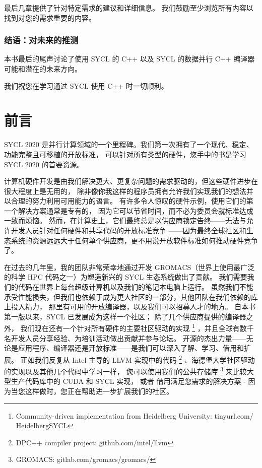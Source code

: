 最后几章提供了针对特定需求的建议和详细信息。 我们鼓励至少浏览所有内容以找到对您的需求重要的内容。

\subsubsection*{结语：对未来的推测}

本书最后的尾声讨论了使用 SYCL 的 C++ 以及 SYCL 的数据并行 C++ 编译器可能和潜在的未来方向。

我们祝您在学习通过 SYCL 使用 C++ 时一切顺利。

\newpage
\section*{前言}
SYCL 2020 是并行计算领域的一个里程碑。我们第一次拥有了一个现代、稳定、功能完整且可移植的开放标准，
可以针对所有类型的硬件，您手中的书是学习 SYCL 2020 的首要资源。

计算机硬件开发是由我们解决更大、更复杂问题的需求驱动的，但这些硬件进步在很大程度上是无用的，
除非像你我这样的程序员拥有允许我们实现我们的想法并以合理的努力利用可用能力的语言。
有许多令人惊叹的硬件示例，使用它们的第一个解决方案通常是专有的，
因为它可以节省时间，而不必为委员会就标准达成一致而烦恼。
然而，在计算史上，它们最终总是以供应商锁定告终——无法与允许开发人员针对任何硬件和共享代码的开放标准竞争
——因为最终全球社区和生态系统的资源远远大于任何单个供应商，更不用说开放软件标准如何推动硬件竞争了。

在过去的几年里，我的团队非常荣幸地通过开发 GROMACS（世界上使用最广泛的科学 HPC 代码之一）为塑造新兴的 SYCL 生态系统做出了贡献。 
我们需要我们的代码在世界上每台超级计算机以及我们的笔记本电脑上运行。 
虽然我们不能承受性能损失，但我们也依赖于成为更大社区的一部分，其他团队在我们依赖的库上投入精力，
那里有可用的开放编译器，以及我们可以招募人才的地方。 
自本书第一版以来，SYCL 已发展成为这样一个社区； 除了几个供应商提供的编译器之外，
我们现在还有一个针对所有硬件的主要社区驱动的实现
\footnote{Community-driven implementation from Heidelberg University: tinyurl.com/ HeidelbergSYCL}
，并且全球有数千名开发人员分享经验、为培训活动做出贡献并参与论坛。 
开源的杰出力量——无论是应用程序、编译器还是开放标准——是我们可以深入了解、学习、借用和扩展。 
正如我们反复从 Intel 主导的 LLVM 实现中的代码 \footnote{DPC++ compiler project: github.com/intel/llvm} 、海德堡大学社区驱动的实现以及其他几个代码中学习一样，
您可以使用我们的公共存储库 \footnote{GROMACS: gitlab.com/gromacs/gromacs/} 来比较大型生产代码库中的 CUDA 和 SYCL 实现，
或者 借用满足您需求的解决方案 - 因为当您这样做时，您正在帮助进一步扩展我们的社区。

